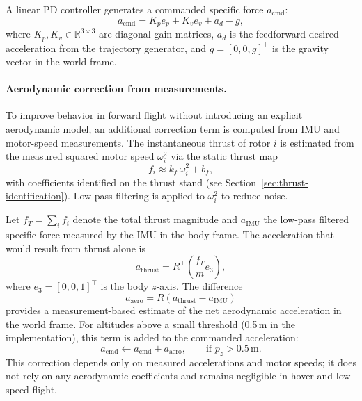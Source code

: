 A linear PD controller generates a commanded specific force $a_{\mathrm{cmd}}$:
\begin{equation}
    a_{\mathrm{cmd}} =
      K_p e_p
    + K_v e_v
    + a_d
    - g,
\end{equation}
where $K_p, K_v \in \mathbb{R}^{3 \times 3}$ are diagonal gain matrices, $a_d$ is
the feedforward desired acceleration from the trajectory generator, and
$g = [0, 0, g]^\top$ is the gravity vector in the world frame.

\paragraph{Aerodynamic correction from measurements.}
To improve behavior in forward flight without introducing an explicit aerodynamic
model, an additional correction term is computed from IMU and motor-speed
measurements. The instantaneous thrust of rotor $i$ is estimated from the measured
squared motor speed $\omega_i^2$ via the static thrust map
\begin{equation}
    f_i \approx k_f \,\omega_i^2 + b_f,
\end{equation}
with coefficients identified on the thrust stand (see
Section~\ref{sec:thrust-identification}). Low-pass filtering is applied to
$\omega_i^2$ to reduce noise.

Let $f_T = \sum_i f_i$ denote the total thrust magnitude and
$a_{\mathrm{IMU}}$ the low-pass filtered specific force measured by the IMU in the
body frame. The acceleration that would result from thrust alone is
\begin{equation}
    a_{\mathrm{thrust}} = R^\top \left(\frac{f_T}{m} e_3\right),
\end{equation}
where $e_3 = [0, 0, 1]^\top$ is the body $z$-axis. The difference
\begin{equation}
    a_{\mathrm{aero}} = R \left(a_{\mathrm{thrust}} - a_{\mathrm{IMU}}\right)
\end{equation}
provides a measurement-based estimate of the net aerodynamic acceleration in the
world frame. For altitudes above a small threshold (0.5\,m in the implementation),
this term is added to the commanded acceleration:
\begin{equation}
    a_{\mathrm{cmd}} \leftarrow a_{\mathrm{cmd}} + a_{\mathrm{aero}}, \qquad
    \text{if } p_z > 0.5\,\mathrm{m}.
\end{equation}
This correction depends only on measured accelerations and motor speeds; it does
not rely on any aerodynamic coefficients and remains negligible in hover and
low-speed flight.

